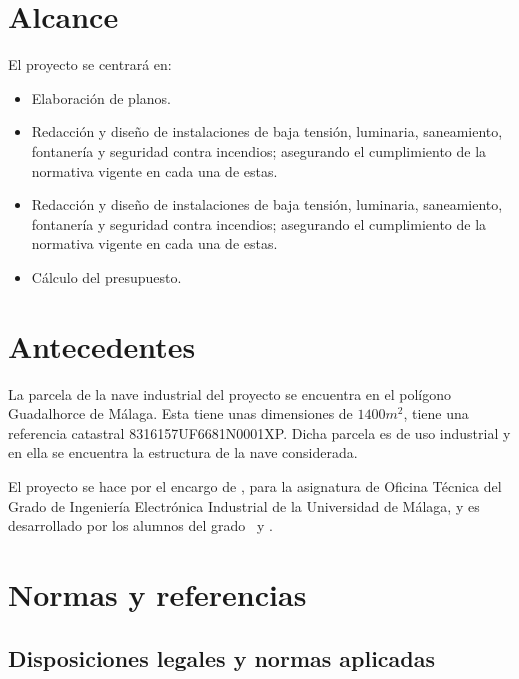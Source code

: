 \documentclass[../main.tex]{subfiles}
\begin{document}
\section{Alcance}
El proyecto se centrará en:
\begin{itemize}
    \item Elaboración de planos.
    \item Redacción y diseño de instalaciones de baja tensión, luminaria, saneamiento, fontanería y seguridad contra incendios; asegurando el cumplimiento de la normativa vigente en cada una de estas.
    \item Redacción y diseño de instalaciones de baja tensión, luminaria, saneamiento, fontanería y seguridad contra incendios; asegurando el cumplimiento de la normativa vigente en cada una de estas.
    \item Cálculo del presupuesto.
\end{itemize}

\section{Antecedentes}
La parcela de la nave industrial del proyecto se encuentra en el polígono Guadalhorce de Málaga. Esta tiene unas dimensiones de $1400 m^2$, tiene una referencia catastral 8316157UF6681N0001XP. Dicha parcela es de uso industrial y en ella se encuentra la estructura de la nave considerada. \par
\vspace{0.5 cm}
El proyecto se hace por el encargo de \Solicitante, para la asignatura de Oficina Técnica del Grado de Ingeniería Electrónica Industrial de la Universidad de Málaga, y es desarrollado por los alumnos del grado \Autora \ y \Autor.

\section{Normas y referencias}

\subsection{Disposiciones legales y normas aplicadas}
\end{document}
